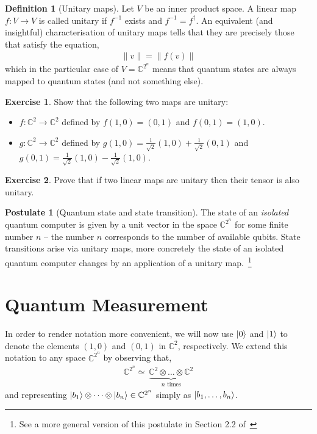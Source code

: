 \documentclass[a4paper, 11pt]{article}
\newcommand{\complex}{\mathbb{C}}
\theoremstyle{definition}
\newtheorem{definition}{Definition}
\newtheorem{exercise}{Exercise}
\newtheorem{postulate}{Postulate}
\begin{document}
\begin{definition}[Unitary maps]
  Let $V$ be an inner product space. A linear map $f : V \to V$ is
  called unitary if $f^{-1}$ exists and $f^{-1} = f^\dagger$.  An
  equivalent (and insightful) characterisation of unitary maps tells
  that they are precisely those that satisfy the equation,
  \begin{align*}
    \| v \| = \| f(v) \|
  \end{align*}
  which in the particular case of $V = \complex^{2^n}$ means that
  quantum states are always mapped to quantum states (and not
  something else).
\end{definition}

\begin{exercise}
  Show that the following two maps are unitary:
  \begin{itemize}
  \item $f : \complex^2 \to \complex^2$ defined by $f(1,0) = (0,1)$ and
    $f(0,1) = (1,0)$.
  \item $g : \complex^2 \to \complex^2$ defined by
  $g(1,0) = \frac{1}{\sqrt{2}}(1,0) + \frac{1}{\sqrt{2}}(0,1)$ and
  $g(0,1) = \frac{1}{\sqrt{2}}(1,0) - \frac{1}{\sqrt{2}}(1,0)$.
  \end{itemize}
\end{exercise}

\begin{exercise}
  Prove that if two linear maps are unitary then their tensor is also
  unitary.
\end{exercise}

\begin{postulate}[Quantum state and state transition]
  The state of an \emph{isolated} quantum computer is given by a unit
  vector in the space $\complex^{2^n}$ for some finite number $n$ --
  the number $n$ corresponds to the number of available qubits. State
  transitions arise via unitary maps, more concretely the state of an
  isolated quantum computer changes by an application of a unitary
  map.~\footnote{See a more general version of this postulate in
    Section 2.2 of~\cite{nielsen02}}
\end{postulate}

\section{Quantum Measurement}

In order to render notation more convenient, we will now use $\ket{0}$
and $\ket{1}$ to denote the elements $(1,0)$ and $(0,1)$ in
$\complex^2$, respectively. We extend this notation to any space
$\complex^{2^n}$ by observing that,
\begin{align*}
  \complex^{2^n} \simeq\ \underbrace{\complex^2 \otimes \dots \otimes \complex^2}_
  {n \text{ times} }
\end{align*}
and representing
$\ket{b_1} \otimes \dots \otimes \ket{b_n} \in \complex^{2^n}$ simply
as $\ket{b_1, \dots, b_n}$.
\end{document}
